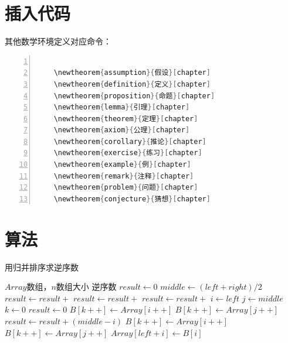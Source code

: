 \documentclass{cqupt_thesis}
\begin{document}
	\section{插入代码}
    其他数学环境定义对应命令：
    \begin{lstlisting}[language = java, numbers=left,
    numberstyle=\tiny,keywordstyle=\color{blue!70},
    commentstyle=\color{red!50!green!50!blue!50},frame=shadowbox,
    rulesepcolor=\color{red!20!green!20!blue!20},basicstyle=\ttfamily]

	\newtheorem{assumption}{假设}[chapter]
    \newtheorem{definition}{定义}[chapter]
    \newtheorem{proposition}{命题}[chapter]
    \newtheorem{lemma}{引理}[chapter]
    \newtheorem{theorem}{定理}[chapter]
    \newtheorem{axiom}{公理}[chapter]
    \newtheorem{corollary}{推论}[chapter]
    \newtheorem{exercise}{练习}[chapter]
    \newtheorem{example}{例}[chapter]
    \newtheorem{remark}{注释}[chapter]
    \newtheorem{problem}{问题}[chapter]
    \newtheorem{conjecture}{猜想}[chapter]

    \end{lstlisting}

	\section{算法}
	
	\begin{algorithm}[H] 
		
		\label{用归并排序求逆序数}
		\caption{用归并排序求逆序数}  
		\begin{algorithmic}[1] %
			\Require $Array$数组，$n$数组大小  
			\Ensure 逆序数  
			\State $result \gets 0$  
			\State $middle \gets (left + right) / 2$  
			\State $result \gets result +$   
			\State $result \gets result +$   
			\State $result \gets result +$   
			\EndIf  
			\State {}  
			\EndFunction  
			\State  
			\State $i\gets left$  
			\State $j\gets middle$  
			\State $k\gets 0$  
			\State $result \gets 0$  
			\State $B[k++]\gets Array[i++]$  
			\Else  
			\State $B[k++] \gets Array[j++]$  
			\State $result \gets result + (middle - i)$  
			\EndIf  
			\EndWhile  
			\State $B[k++] \gets Array[i++]$  
			\EndWhile  
			\State $B[k++] \gets Array[j++]$  
			\EndWhile  
			\State $Array[left + i] \gets B[i]$  
			\EndFor  
			\State {}  
			\EndFunction  
		\end{algorithmic}  
	\end{algorithm} 
\end{document}
